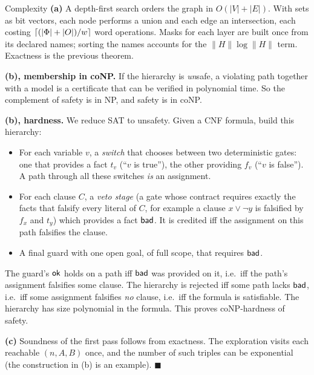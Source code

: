 \begin{plainproof}{Complexity}
\textbf{(a)} A depth-first search orders the graph in $O(|V|+|E|)$. With sets as bit vectors, each node performs a union and each edge an intersection, each costing $\lceil(|\Phi|+|O|)/w\rceil$ word operations. Masks for each layer are built once from its declared names; sorting the names accounts for the $\|H\|\log\|H\|$ term. Exactness is the previous theorem.

\textbf{(b), membership in coNP.} If the hierarchy is \emph{un}safe, a violating path together with a model is a certificate that can be verified in polynomial time. So the complement of safety is in NP, and safety is in coNP.

\textbf{(b), hardness.} We reduce SAT to unsafety. Given a CNF formula, build this hierarchy:
\begin{itemize}
\item For each variable $v$, a \emph{switch} that chooses between two deterministic gates: one that provides a fact $t_v$ (``$v$ is true''), the other providing $f_v$ (``$v$ is false''). A path through all these switches \emph{is} an assignment.
\item For each clause $C$, a \emph{veto stage} (a gate whose contract requires exactly the facts that falsify every literal of $C$, for example a clause $x\vee\neg y$ is falsified by $f_x$ and $t_y$) which provides a fact $\textsf{bad}$. It is credited iff the assignment on this path falsifies the clause.
\item A final guard with one open goal, of full scope, that requires $\textsf{bad}$.
\end{itemize}
The guard's $\mathsf{ok}$ holds on a path iff $\textsf{bad}$ was provided on it, i.e.\ iff the path's assignment falsifies some clause. The hierarchy is rejected iff some path lacks $\textsf{bad}$, i.e.\ iff some assignment falsifies \emph{no} clause, i.e.\ iff the formula is satisfiable. The hierarchy has size polynomial in the formula. This proves coNP-hardness of safety.

\textbf{(c)} Soundness of the first pass follows from exactness. The exploration visits each reachable $(n,A,B)$ once, and the number of such triples can be exponential (the construction in (b) is an example). \hfill$\blacksquare$
\end{plainproof}

